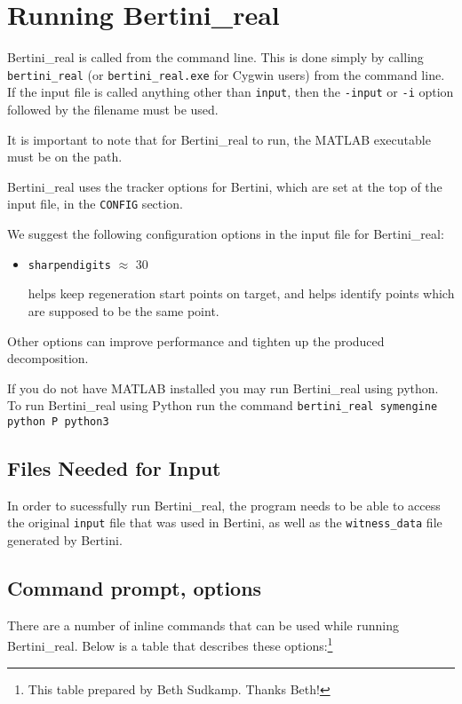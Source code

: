 
\section{Running Bertini\_real}
\label{sec:running_br}

Bertini\_real is called from the command line.   This is done simply by calling \texttt{bertini\_real} (or \texttt{bertini\_real.exe} for Cygwin users) from the command line. If the input file is called anything other than \texttt{input}, then the \texttt{-input} or \texttt{-i} option followed by the filename must be used.

It is important to note that for Bertini\_real to run, the MATLAB executable must be on the path.


Bertini\_real uses the tracker options for Bertini, which are set at the top of the input file, in the {\tt CONFIG} section.

We suggest the following configuration options in the input file for Bertini\_real:
\begin{itemize}
\item {\tt sharpendigits} $\approx$ 30

helps keep regeneration start points on target, and helps identify points which are supposed to be the same point.
\end{itemize}


Other options can improve performance and tighten up the produced decomposition.

If you do not have MATLAB installed you may run Bertini\_real using python. To run Bertini\_real using Python run the command  \texttt{bertini\_real \-symengine python \-P python3}


\subsection{Files Needed for Input}
In order to sucessfully run Bertini\_real, the program needs to be able to access the original \texttt{input} file that was used in Bertini, as well as the \texttt{witness\_data} file generated by Bertini.


\subsection{Command prompt, options}
There are a number of inline commands that can be used while running Bertini\_real. Below is a table that describes these options:\footnote{This table prepared by Beth Sudkamp.  Thanks Beth!}

